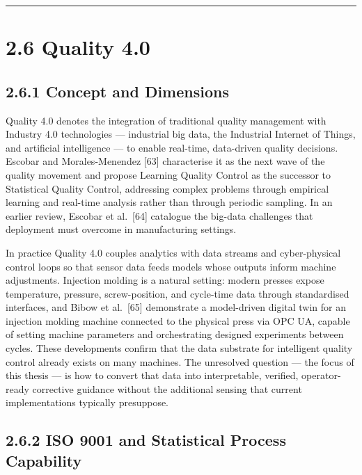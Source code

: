 \begin{center}\rule{0.5\linewidth}{0.5pt}\end{center}

\hypertarget{quality-4.0}{%
\section{2.6 Quality 4.0}\label{quality-4.0}}

\hypertarget{concept-and-dimensions}{%
\subsection{2.6.1 Concept and Dimensions}\label{concept-and-dimensions}}

Quality 4.0 denotes the integration of traditional quality management with Industry 4.0 technologies --- industrial big data, the Industrial Internet of Things, and artificial intelligence --- to enable real-time, data-driven quality decisions. Escobar and Morales-Menendez {[}63{]} characterise it as the next wave of the quality movement and propose Learning Quality Control as the successor to Statistical Quality Control, addressing complex problems through empirical learning and real-time analysis rather than through periodic sampling. In an earlier review, Escobar et al.~{[}64{]} catalogue the big-data challenges that deployment must overcome in manufacturing settings.

In practice Quality 4.0 couples analytics with data streams and cyber-physical control loops so that sensor data feeds models whose outputs inform machine adjustments. Injection molding is a natural setting: modern presses expose temperature, pressure, screw-position, and cycle-time data through standardised interfaces, and Bibow et al.~{[}65{]} demonstrate a model-driven digital twin for an injection molding machine connected to the physical press via OPC UA, capable of setting machine parameters and orchestrating designed experiments between cycles. These developments confirm that the data substrate for intelligent quality control already exists on many machines. The unresolved question --- the focus of this thesis --- is how to convert that data into interpretable, verified, operator-ready corrective guidance without the additional sensing that current implementations typically presuppose.

\hypertarget{iso-9001-and-statistical-process-capability}{%
\subsection{2.6.2 ISO 9001 and Statistical Process Capability}\label{iso-9001-and-statistical-process-capability}}

